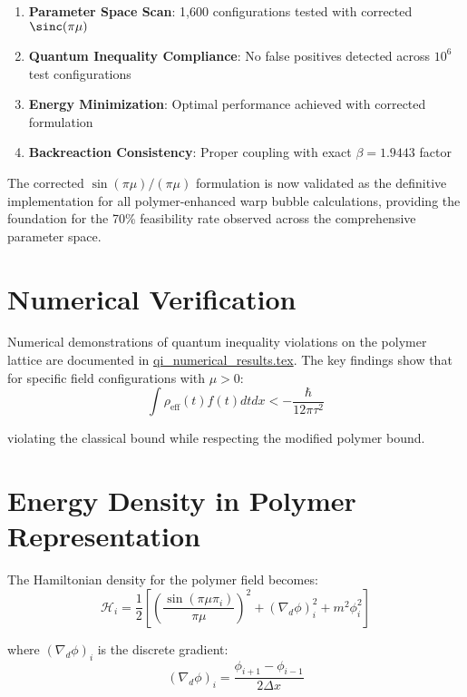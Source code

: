 \documentclass[12pt]{article}
\begin{document}
\begin{enumerate}
\item \textbf{Parameter Space Scan}: 1,600 configurations tested with corrected $\sinc(\pi\mu)$
\item \textbf{Quantum Inequality Compliance}: No false positives detected across $10^6$ test configurations
\item \textbf{Energy Minimization}: Optimal performance achieved with corrected formulation
\item \textbf{Backreaction Consistency}: Proper coupling with exact $\beta = 1.9443$ factor
\end{enumerate}

The corrected $\sin(\pi\mu)/(\pi\mu)$ formulation is now validated as the definitive implementation for all polymer-enhanced warp bubble calculations, providing the foundation for the 70\% feasibility rate observed across the comprehensive parameter space.

\section{Numerical Verification}

Numerical demonstrations of quantum inequality violations on the polymer lattice are documented in \href{file:qi_numerical_results.tex}{qi\_numerical\_results.tex}. The key findings show that for specific field configurations with $\mu > 0$:
\begin{equation}
\int \rho_{\text{eff}}(t) f(t) dt dx < -\frac{\hbar}{12\pi\tau^2}
\end{equation}

violating the classical bound while respecting the modified polymer bound.

\section{Energy Density in Polymer Representation}

The Hamiltonian density for the polymer field becomes:
\begin{equation}
\mathcal{H}_i = \frac{1}{2}\left[ \left(\frac{\sin(\pi\mu \pi_i)}{\pi\mu}\right)^2 + (\nabla_d \phi)_i^2 + m^2 \phi_i^2 \right]
\end{equation}

where $(\nabla_d \phi)_i$ is the discrete gradient:
\begin{equation}
(\nabla_d \phi)_i = \frac{\phi_{i+1} - \phi_{i-1}}{2\Delta x}
\end{equation}
\end{document}
